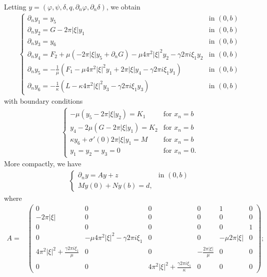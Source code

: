 \documentclass[11pt,letterpaper,reqno]{amsart}
\numberwithin{equation}{section}
\newcommand{\abs}[1]{\left\lvert#1\right\rvert}
\begin{document}
Letting \(y = (\varphi,\psi,\delta,q,\partial_{n}\varphi,\partial_{n}\delta)\), we obtain
\begin{align} \label{odebulk}
    \begin{cases}
        \partial_{n}y_{1}=y_{5} &\mbox{in \((0,b)\)} \\
        \partial_{n}y_{2}=G-2\pi\abs{\xi}y_{1} &\mbox{in \((0,b)\)} \\
        \partial_{n}y_{3}=y_{6} &\mbox{in \((0,b)\)} \\
        \partial_{n}y_{4}=F_{2}+\mu(-2\pi\abs{\xi}y_{5}+\partial_{n}G)-\mu 4\pi^{2}\abs{\xi}^{2}y_{2} -\gamma 2\pi i \xi_{1}y_{2} &\mbox{in \((0,b)\)} \\
        \partial_{n}y_{5}=-\frac{1}{\mu}(F_{1}-\mu 4\pi^{2}\abs{\xi}^{2}y_{1}+2\pi \abs{\xi}y_{4}-\gamma 2\pi i \xi_{1}y_{1}) &\mbox{in \((0,b)\)} \\
        \partial_{n}y_{6}=-\frac{1}{\kappa}(L-\kappa 4\pi^{2}\abs{\xi}^{2}y_3 - \gamma 2\pi i \xi_{1} y_3) &\mbox{in \((0,b)\)}
    \end{cases}
\end{align}
with boundary conditions
\begin{align} \label{odebound}
    \begin{cases}
        -\mu(y_{5}-2\pi\abs{\xi}y_{2}) =K_{1} &\mbox{for \(x_{n}=b\)} \\
        y_{4}-2\mu(G-2\pi\abs{\xi}y_{1})=K_{2} &\mbox{for \(x_{n}=b\)} \\
        \kappa y_{6}+\sigma'(0) 2\pi \abs{\xi}y_{1}=M &\mbox{for \(x_{n}=b\)} \\
        y_{1}=y_{2}=y_{3}=0 &\mbox{for \(x_{n}=0\)}.
    \end{cases}
\end{align}
More compactly, we have
\begin{align}
    \begin{cases}
        \partial_{n}y=Ay+z &\mbox{in \((0,b)\)} \\
        My(0)+Ny(b)=d,
    \end{cases}
\end{align}
where
\begin{align}
    A=&
    \begin{pmatrix}
        0 & 0 & 0 & 0 & 1 & 0 \\
        -2\pi \abs{\xi} & 0 & 0 & 0 & 0 & 0 \\
        0 & 0 & 0 & 0 & 0 & 1 \\
        0 & -\mu 4\pi^{2}\abs{\xi}^{2}-\gamma 2\pi i \xi_{1} & 0 & 0 & -\mu 2\pi \abs{\xi} & 0 \\
        4\pi^{2}\abs{\xi}^{2}+\frac{\gamma 2\pi i \xi_{1}}{\mu} & 0 & 0 & -\frac{2\pi\abs{\xi}}{\mu} & 0 & 0 \\
        0 & 0 & 4\pi^{2}\abs{\xi}^{2}+\frac{\gamma 2\pi i \xi_{1}}{\kappa} & 0 & 0 & 0
    \end{pmatrix}
    ;
\end{align}
\end{document}
